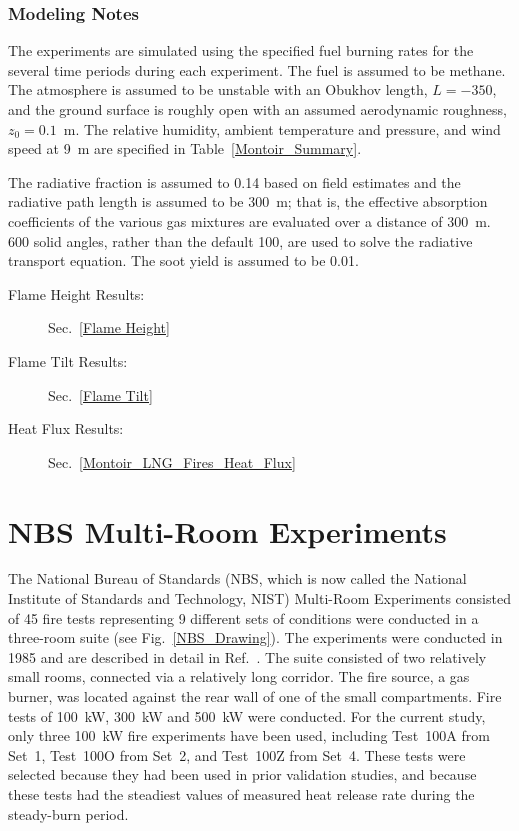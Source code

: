 \subsubsection{Modeling Notes}

The experiments are simulated using the specified fuel burning rates for the several time periods during each experiment. The fuel is assumed to be methane. The atmosphere is assumed to be unstable with an Obukhov length, $L=-350$, and the ground surface is roughly open with an assumed aerodynamic roughness, $z_0=0.1$~m. The relative humidity, ambient temperature and pressure, and wind speed at 9~m are specified in Table~\ref{Montoir_Summary}. 

The radiative fraction is assumed to 0.14 based on field estimates and the radiative path length is assumed to be 300~m; that is, the effective absorption coefficients of the various gas mixtures are evaluated over a distance of 300~m. 600 solid angles, rather than the default 100, are used to solve the radiative transport equation. The soot yield is assumed to be 0.01.

\begin{description}
\item[Flame Height Results:] Sec.~\ref{Flame Height}
\item[Flame Tilt Results:] Sec.~\ref{Flame Tilt}
\item[Heat Flux Results:] Sec.~\ref{Montoir_LNG_Fires_Heat_Flux}
\end{description}

\FloatBarrier


\section{NBS Multi-Room Experiments}
\label{NBS_Multi-Room_Description}

The National Bureau of Standards (NBS, which is now called the National Institute of Standards and Technology, NIST) Multi-Room Experiments consisted of 45 fire tests representing 9 different sets of conditions were conducted in a three-room suite (see Fig.~\ref{NBS_Drawing}). The experiments were conducted in 1985 and are described in detail in Ref.~\cite{Peacock:NBS_Multi-Room}. The suite consisted of two relatively small rooms, connected via a relatively long corridor. The fire source, a gas burner, was located against the rear wall of one of the small compartments.  Fire tests of 100~kW, 300~kW and 500~kW were conducted. For the current study, only three 100~kW fire experiments have been used, including Test~100A from Set~1, Test~100O from Set~2, and Test~100Z from Set~4. These tests were selected because they had been used in prior validation studies, and because these tests had the steadiest values of measured heat release rate during the steady-burn period.

